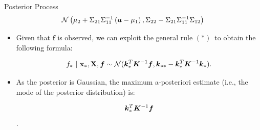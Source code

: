 \begin{frame}[c,allowframebreaks]{Posterior Process}
$$
\mathcal{N}\left(\mu_2 + \Sigma_{21} \Sigma_{11}^{-1}\left(\bm{a} - \mu_1\right), \Sigma_{22} - \Sigma_{21}\Sigma_{11}^{-1}\Sigma_{12} \right)
$$


\framebreak


\begin{itemize}

\item Given that $\bm{f}$ is observed, we can exploit the general rule ${(*)}\,$ to obtain the following formula: 

\begin{eqnarray*}
f_* ~|~ \mathbf{x}_*, \mathbf{X}, \bm{f} \sim \mathcal{N}(\bm{k}_{*}^{T}\bm{K}^{-1}\bm{f}, \bm{k}_{**} - \bm{k}_*^T \bm{K} ^{-1}\bm{k}_*).
\end{eqnarray*}

\lz
\lz

\item As the posterior is Gaussian, the maximum a-posteriori estimate (i.e., the mode of the posterior distribution) is:

\large $$\bm{k}_{*}^{T}\bm{K}^{-1}\bm{f}$$.

\end{itemize}
\end{frame}
